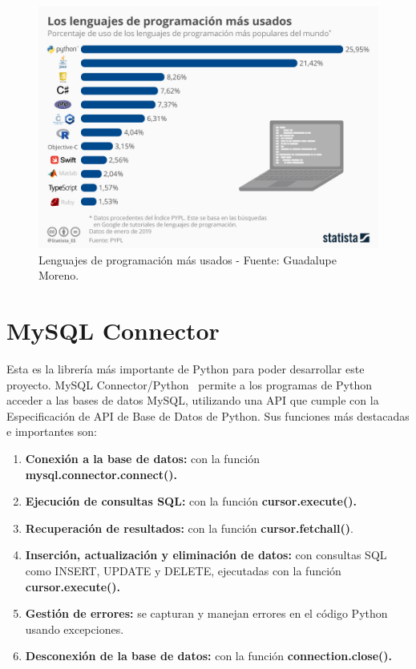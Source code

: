 \documentclass[a4paper, 12pt]{book}
\begin{document}
\begin{figure}
	\centering
	\includegraphics[width=14cm, keepaspectratio]{img/ev_python.jpeg}
	\caption{Lenguajes de programación más usados - Fuente: Guadalupe Moreno.}
	\label{fig:evolucion_python}
\end{figure}

\section{MySQL Connector} 
\label{sec:mysqlconnector}
Esta es la librería más importante de Python para poder desarrollar este proyecto.
MySQL Connector/Python~\cite{mysql:_connectors} permite a los programas de Python acceder a las bases de datos MySQL, utilizando una API que cumple con la Especificación de API de Base de Datos de Python.
Sus funciones más destacadas e importantes son:
\begin{enumerate}
	\item \textbf{Conexión a la base de datos: }con la función \textbf{mysql.connector.connect().}
	\item \textbf{Ejecución de consultas SQL: }con la función \textbf{cursor.execute().}
	\item \textbf{Recuperación de resultados: }con la función \textbf{cursor.fetchall()}.
	\item \textbf{Inserción, actualización y eliminación de datos: }con consultas SQL como INSERT, UPDATE y DELETE, ejecutadas con la función \textbf{cursor.execute().}
	\item \textbf{Gestión de errores: }se capturan y manejan errores en el código Python usando excepciones.
	\item \textbf{Desconexión de la base de datos: }con la función \textbf{connection.close().}
\end{enumerate}
\end{document}

